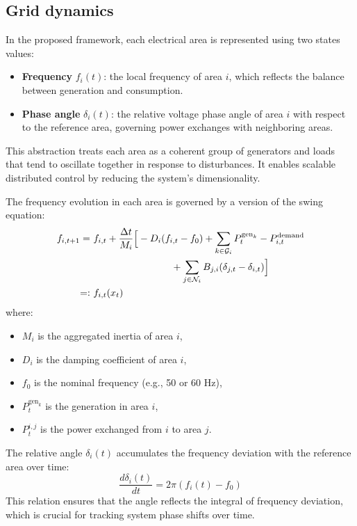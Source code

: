 \documentclass{article}
\begin{document}
\subsection{Grid dynamics}
In the proposed framework, each electrical area is represented using two states values:
\begin{itemize}
    \item \textbf{Frequency} $f_i(t)$: the local frequency of area $i$, which reflects the balance between generation and consumption.
    \item \textbf{Phase angle} $\delta_i(t)$: the relative voltage phase angle of area $i$ with respect to the reference area, governing power exchanges with neighboring areas.
\end{itemize}
This abstraction treats each area as a coherent group of generators and loads that tend to oscillate together in response to disturbances. It enables scalable distributed control by reducing the system's dimensionality.

The frequency evolution in each area is governed by a version of the swing equation:
\begin{align}
    f_{i,t+1} =\ & f_{i,t} + \frac{\Delta t}{M_i} \Big[ -D_i(f_{i,t} - f_0) 
    + \sum_{k \in \mathcal{G}_i} P^{\text{gen}_k}_t 
    - P^{\text{demand}}_{i,t} \notag \\
    &\qquad\qquad\qquad\qquad
    + \sum_{j \in \mathcal{N}_i} B_{j,i}(\delta_{j,t} - \delta_{i,t}) \Big] \\
    =:\ & f_{i,t}(x_t)
\end{align}
where:
\begin{itemize}
    \item $M_i$ is the aggregated inertia of area $i$,
    \item $D_i$ is the damping coefficient of area $i$,
    \item $f_0$ is the nominal frequency (e.g., 50 or 60 Hz),
    \item $P^{\text{gen}_k}_t$ is the generation in area $i$,
    \item $P^{i,j}_t$ is the power exchanged from $i$ to area $j$.
\end{itemize}

The relative angle $\delta_i(t)$ accumulates the frequency deviation with the reference area over time:
\begin{equation}
    \frac{d\delta_i(t)}{dt} = 2\pi(f_i(t) - f_0)
\end{equation}
This relation ensures that the angle reflects the integral of frequency deviation, which is crucial for tracking system phase shifts over time. 
\end{document}
